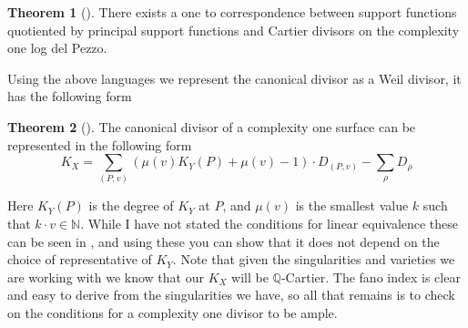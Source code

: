 \documentclass[11pt]{report}
\theoremstyle{definition}
\newtheorem{thm}{Theorem}[section]
\theoremstyle{definition}
\theoremstyle{definition}
\theoremstyle{definition}
\theoremstyle{definition}
\theoremstyle{definition}
\theoremstyle{definition}
\begin{document}
\begin{thm}[\cite{PS}]
There exists a one to correspondence between support functions quotiented by principal support functions and Cartier divisors on the complexity one log del Pezzo.
\end{thm}
Using the above languages we represent the canonical divisor as a Weil divisor, it has the following form
\begin{thm}[\cite{PS}]
The canonical divisor of a complexity one surface can be represented in the following form
\[
K_X = \sum_{(P, v)} ( \mu (v) K_Y (P) + \mu (v) - 1) \cdot D_{(P,v)} - \sum_\rho D_\rho
\]
\end{thm}
Here $K_Y(P)$ is the degree of $K_Y$ at $P$, and $\mu (v)$ is the smallest value $k$ such that $k \cdot v \in \mathbb{N}$.  While I have not stated the conditions for linear equivalence these can be seen in \cite{PS}, and using these you can show that it does not depend on the choice of representative of $K_Y$. Note that given the singularities and varieties we are working with we know that our $K_X$ will be $\mathbb{Q}$-Cartier. The fano index is clear and easy to derive from the singularities we have, so all that remains is to check on the conditions for a complexity one divisor to be ample.
\end{document}
